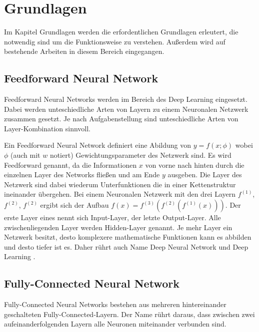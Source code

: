 \chapter{Grundlagen}
\label{cha:fundamentals}

Im Kapitel Grundlagen werden die erfordentlichen Grundlagen erleutert, die notwendig sind um die Funktionsweise zu verstehen. Außerdem wird auf bestehende Arbeiten in diesem Bereich eingegangen.

\section{Feedforward Neural Network}

Feedforward Neural Networks werden im Bereich des Deep Learning eingesetzt. Dabei werden unteschiedliche Arten von Layern zu einem Neuronalen Netzwerk zusammen gesetzt. Je nach Aufgabenstellung sind unteschiedliche Arten von Layer-Kombination sinnvoll.

Ein Feedforward Neural Network definiert eine Abildung von $ y = f(x; \phi) $ wobei $ \phi $ (auch mit $ w $ notiert) Gewichtungsparameter des Netzwerk sind. Es wird Feedforward genannt, da die Informationen $ x $ von vorne nach hinten durch die einzelnen Layer des Networks fließen und am Ende $ y $ ausgeben. Die Layer des Netzwerk sind dabei wiederum Unterfunktionen die in einer Kettenstruktur ineinander übergehen. Bei einem Neuronalen Netzwerk mit den drei Layern $ f^{(1)} $, $ f^{(2)} $, $ f^{(2)} $ ergibt sich der Aufbau $ f(x) = f^{(3)}(f^{(2)}(f^{(1)}(x))) $. Der erste Layer eines nennt sich Input-Layer, der letzte Output-Layer. Alle zwischenliegenden Layer werden Hidden-Layer genannt. Je mehr Layer ein Netzwerk besitzt, desto komplexere mathematische Funktionen kann es abbilden und desto tiefer ist es. Daher rührt auch Name Deep Neural Network und Deep Learning \cite[164-165]{Goodfellow-et-al-2016}.

\pagebreak

\section{Fully-Connected Neural Network}

Fully-Connected Neural Networks bestehen aus mehreren hintereinander geschalteten Fully-Connected-Layern. Der Name rührt daraus, dass zwischen zwei aufeinanderfolgenden Layern alle Neuronen miteinander verbunden sind.

